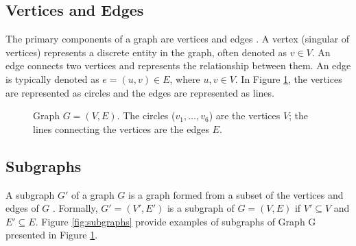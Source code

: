         \subsection{Vertices and Edges}
        
            The primary components of a graph are vertices and edges \cite{cormen, bondy1976graph}. A vertex (singular of vertices) represents a discrete entity in the graph, often denoted as \( v \in V \). An edge connects two vertices and represents the relationship between them. An edge is typically denoted as \( e = (u, v) \in E \), where \( u, v \in V \).
            In Figure \ref{fig:base_graph}, the vertices are represented as circles and the edges are represented as lines.

            
            \begin{figure}[!ht]
                \centering
                \caption[Graph $G = (V, E)$.]{Graph $G = (V, E)$. The circles ($v_1, \ldots, v_6$) are the vertices $V$; the lines connecting the vertices are the edges $E$.} \label{fig:base_graph}
            \end{figure}
        
        \subsection{Subgraphs}
        
            A subgraph \( G' \) of a graph \( G \) is a graph formed from a subset of the vertices and edges of \( G \) \cite{cormen, bondy1976graph}. Formally, \( G' = (V', E') \) is a subgraph of \( G = (V, E) \) if \( V' \subseteq V \) and \( E' \subseteq E \). Figure \ref{fig:subgraphs} provide examples of subgraphs of Graph G presented in Figure \ref{fig:base_graph}.

